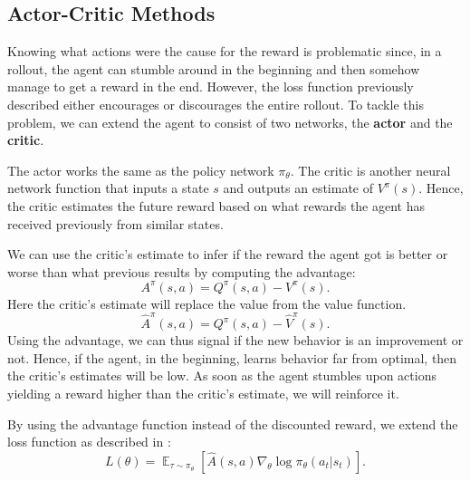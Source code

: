 \documentclass[12pt,A4]{report}
\theoremstyle{definition}
\begin{document}

\subsection{Actor-Critic Methods}
Knowing what actions were the cause for the reward is problematic since, in a rollout, the agent can stumble around in the beginning and then somehow manage to get a reward in the end. However, the loss function previously described either encourages or discourages the entire rollout. To tackle this problem, we can extend the agent to consist of two networks, the \textbf{actor} and the \textbf{critic}. 

The actor works the same as the policy network $\pi_\theta$. The critic is another neural network function that inputs a state $s$ and outputs an estimate of $V^\pi(s)$. Hence, the critic estimates the future reward based on what rewards the agent has received previously from similar states.


We can use the critic's estimate to infer if the reward the agent got is better or worse than what previous results by computing the advantage:
\[A^\pi(s,a) = Q^\pi(s, a) - V^\pi(s).\]
Here the critic's estimate will replace the value from the value function.
\[\hat{A}^\pi(s,a) = Q^\pi(s, a) - \hat{V}^\pi(s).\]
Using the advantage, we can thus signal if the new behavior is an improvement or not. Hence, if the agent, in the beginning, learns behavior far from optimal, then the critic's estimates will be low. As soon as the agent stumbles upon actions yielding a reward higher than the critic's estimate, we will reinforce it. 

By using the advantage function instead of the discounted reward, we extend the loss function as described in \citet{OpenAI}:
\[ L(\theta) = \mathop{\mathbb{E}}_{\tau \sim \pi_\theta} [\hat{A}(s,a) \nabla_\theta \log \pi_\theta (a_t|s_t) ]. \]
\end{document}
